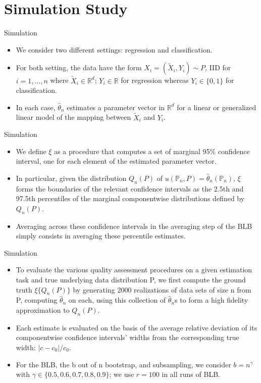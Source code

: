\documentclass[12pt]{beamer}
\begin{document}
\section{Simulation Study}
\begin{frame}{Simulation}
\begin{itemize}
\item We consider two different settings: regression and classification.
\item For both setting, the data have the form $X_{i}=\left(\tilde{X}_{i}, Y_{i}\right) \sim P$, IID for $i=1,\dots,n$ where $\tilde{X}_{i}\in \mathbb{R}^d$; $Y_i \in \mathbb{R}$ for regression whereas $Y_i \in\{0,1\}$ for classification.
\item In each case, $\hat{\theta}_n$ estimates a parameter vector in $\mathbb{R}^d$ for a linear or
generalized linear model of the mapping between $\tilde{X}_{i}$ and $Y_i$.
\end{itemize}
\end{frame}

\begin{frame}{Simulation}
\begin{itemize}
\item We define $\xi$ as a procedure that computes a set of marginal 95\% confidence interval, one for each element of the estimated
parameter vector.
\item In particular, given the distribution $Q_n(P)$ of $u\left(\mathbb{P}_{n}, P\right)=\hat{\theta}_{n}\left(\mathbb{P}_{n}\right)$, $\xi$ forms the boundaries of the relevant confidence intervals as the 2.5th
and 97.5th percentiles of the marginal componentwise distributions defined by $Q_n(P)$.
\item Averaging
across these confidence intervals in the averaging step of the BLB simply consists in averaging
these percentile estimates.
\end{itemize}
\end{frame}

\begin{frame}{Simulation}
\begin{itemize}
\item To evaluate the various quality assessment procedures on a given estimation task and true
underlying data distribution P, we first compute the ground truth $\xi\{Q_n(P)\}$ by generating 2000
realizations of data sets of size n from P, computing $\hat{\theta}_n$ on each, using this collection of $\hat{\theta}_n$s to form a high fidelity approximation to $Q_n(P)$.
\item Each estimate is evaluated on the basis of the average relative deviation of its componentwise confidence intervals' widths from the corresponding true width: $|c-c_0|/c_0$.
\item For the BLB, the b out of n bootstrap, and subsampling, we consider $b=n^{\gamma}$ with $\gamma\in \{0.5,0.6,0.7,0.8,0.9 \}$; we use $r=100$ in all runs of BLB. 
\end{itemize}
\end{frame}
\end{document}
